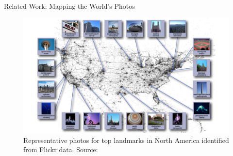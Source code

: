 \documentclass{beamer}
\begin{document}
\begin{frame}{Related Work: Mapping the World's Photos}
  \begin{figure}\centering
    \includegraphics[scale=0.25]{kleinberg2009}
    \caption{Representative photos for top landmarks in North America identified from Flickr data. {\tiny Source: \citet{Kleinberg2009}}}
  \end{figure}
\end{frame}
\end{document}
